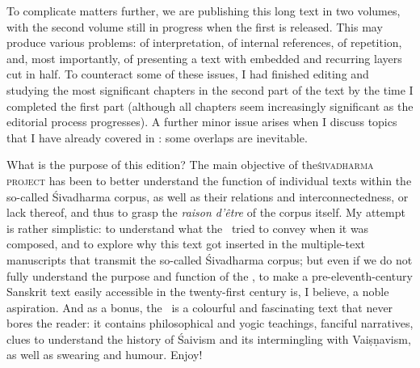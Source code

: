 To complicate matters further, we are publishing this long text
in two volumes, with the second volume still in progress
when the first is released. This may produce various problems:
of interpretation, of internal references, of repetition, 
and, most importantly, of presenting a text with
embedded and recurring layers cut in half. To counteract
some of these issues, I had finished editing and
studying the most significant chapters in 
the second part of the text
by the time I completed the first part
(although all chapters seem increasingly significant
as the editorial process progresses).
A further minor issue arises when
I discuss topics that I have already covered in
: some overlaps are inevitable.

What is the purpose of this edition? The main 
objective of the\linebreak \textsc{śiva\-dharma project} 
has been to better understand the function of 
individual texts within the so-called Śivadharma corpus, 
as well as their relations and interconnectedness, or
lack thereof, and thus to grasp 
the \emph{raison d'être} of the corpus itself. 
My attempt is rather simplistic: to understand
what the \Vss\ tried to convey when it was composed, and
to explore why this text got inserted in the multiple-text 
manuscripts that transmit the so-called Śivadharma corpus; but even if we do not fully understand
the purpose and function of the \Vss, 
to make a pre-eleventh-century
Sanskrit text easily accessible in the twenty-first century is,
I believe, a noble aspiration. And as a bonus,
the \Vss\ is a colourful and fascinating text that never bores the reader:
it contains philosophical and yogic teachings, fanciful narratives,
clues to understand the history of Śaivism and its intermingling with Vaiṣṇavism,
as well as swearing and humour. Enjoy!

\vfill
\pagebreak





